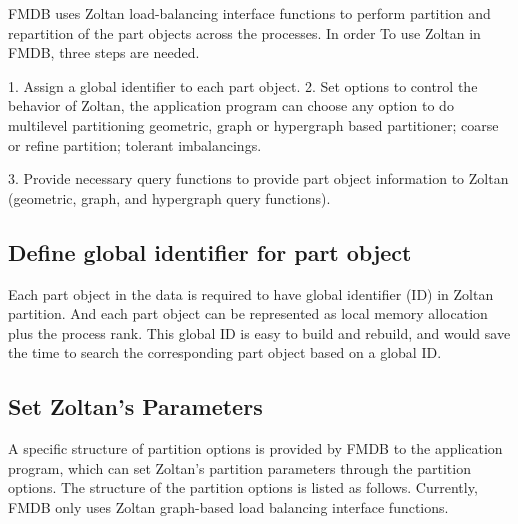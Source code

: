 
FMDB uses Zoltan load-balancing interface functions to perform
partition and repartition of the part objects across the processes. In
order To use Zoltan in FMDB, three steps are needed. 

1. Assign a global identifier to each part object.
2. Set options to control the behavior of Zoltan, the application
program can choose any option to do multilevel
partitioning  
  geometric, graph or hypergraph based partitioner;
  coarse or refine partition; 
  tolerant imbalancings.  
 
3. Provide necessary query functions to provide part object
information to Zoltan (geometric, graph, and hypergraph query functions). 


\subsection{Define global identifier for part object}   

Each part object in the data is required to have global identifier (ID) in
Zoltan partition. And each part object can be represented as local
memory allocation plus the process rank. This global
ID is easy to build and rebuild, and would save the time to search the
corresponding part object based on a global ID. 


\subsection{Set Zoltan's Parameters} %

A specific structure of partition options is provided by FMDB to the
application program, which can set Zoltan's partition parameters
through the partition options. The structure of the partition options
is listed as follows. Currently, FMDB only uses Zoltan graph-based
load balancing interface functions.  

